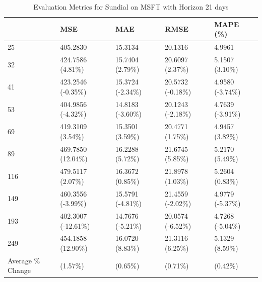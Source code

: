 \begin{table}
\caption{Evaluation Metrics for Sundial on MSFT with Horizon 21 days}
\label{tab:sundial_MSFT_h21_metrics}
\begin{tabular}{lllll}
\toprule
 & MSE & MAE & RMSE & MAPE (\%) \\
\midrule
25 & 405.2830 & 15.3134 & 20.1316 & 4.9961 \\
32 & 424.7586 (4.81\%) & 15.7404 (2.79\%) & 20.6097 (2.37\%) & 5.1507 (3.10\%) \\
41 & 423.2546 (-0.35\%) & 15.3724 (-2.34\%) & 20.5732 (-0.18\%) & 4.9580 (-3.74\%) \\
53 & 404.9856 (-4.32\%) & 14.8183 (-3.60\%) & 20.1243 (-2.18\%) & 4.7639 (-3.91\%) \\
69 & 419.3109 (3.54\%) & 15.3501 (3.59\%) & 20.4771 (1.75\%) & 4.9457 (3.82\%) \\
89 & 469.7850 (12.04\%) & 16.2288 (5.72\%) & 21.6745 (5.85\%) & 5.2170 (5.49\%) \\
116 & 479.5117 (2.07\%) & 16.3672 (0.85\%) & 21.8978 (1.03\%) & 5.2604 (0.83\%) \\
149 & 460.3556 (-3.99\%) & 15.5791 (-4.81\%) & 21.4559 (-2.02\%) & 4.9779 (-5.37\%) \\
193 & 402.3007 (-12.61\%) & 14.7676 (-5.21\%) & 20.0574 (-6.52\%) & 4.7268 (-5.04\%) \\
249 & 454.1858 (12.90\%) & 16.0720 (8.83\%) & 21.3116 (6.25\%) & 5.1329 (8.59\%) \\
Average \% Change & (1.57\%) & (0.65\%) & (0.71\%) & (0.42\%) \\
\bottomrule
\end{tabular}
\end{table}

